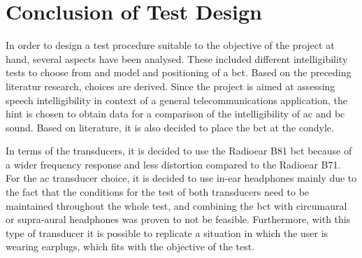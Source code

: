 \section{Conclusion of Test Design}
In order to design a test procedure suitable to the objective of the project at hand, several aspects have been analysed. These included different intelligibility tests to choose from and model and positioning of a \gls{bct}.
Based on the preceding literatur research, choices are derived.
Since the project is aimed at assessing speech intelligibility in context of a general telecommunications application, the \gls{hint} is chosen to obtain data for a  comparison of the intelligibility of \gls{ac} and \gls{bc} sound.
Based on literature, it is also decided to place the \gls{bct} at the condyle.


In terms of the transducers, it is decided to use the Radioear B81 \gls{bct} because of a wider frequency response and less distortion compared to the Radioear B71. For the \gls{ac} transducer choice, it is decided to use in-ear headphones mainly due to the fact that the conditions for the test of both transducers need to be maintained throughout the whole test, and combining the \gls{bct} with circumaural or supra-aural headphones was proven to not be feasible. Furthermore, with this type of transducer it is possible to replicate a situation in which the user is wearing earplugs, which fits with the objective of the test.